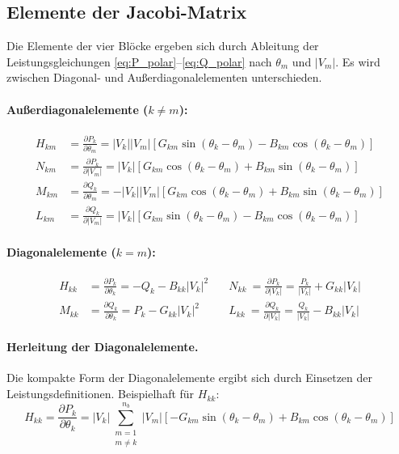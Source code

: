 \subsection{Elemente der Jacobi-Matrix}
\label{subsec:jacobi_elemente}

Die Elemente der vier Blöcke ergeben sich durch Ableitung der Leistungsgleichungen \eqref{eq:P_polar}--\eqref{eq:Q_polar} nach $\theta_m$ und $|V_m|$. Es wird zwischen Diagonal- und Außerdiagonalelementen unterschieden.

\paragraph{Außerdiagonalelemente ($k \neq m$):}
\begin{align}
	H_{km} &= \frac{\partial P_k}{\partial \theta_m} = |V_k||V_m|\left[G_{km}\sin(\theta_k - \theta_m) - B_{km}\cos(\theta_k - \theta_m)\right] \label{eq:H_off}\\[6pt]
	N_{km} &= \frac{\partial P_k}{\partial |V_m|} = |V_k|\left[G_{km}\cos(\theta_k - \theta_m) + B_{km}\sin(\theta_k - \theta_m)\right] \label{eq:N_off}\\[6pt]
	M_{km} &= \frac{\partial Q_k}{\partial \theta_m} = -|V_k||V_m|\left[G_{km}\cos(\theta_k - \theta_m) + B_{km}\sin(\theta_k - \theta_m)\right] \label{eq:M_off}\\[6pt]
	L_{km} &= \frac{\partial Q_k}{\partial |V_m|} = |V_k|\left[G_{km}\sin(\theta_k - \theta_m) - B_{km}\cos(\theta_k - \theta_m)\right] \label{eq:L_off}
\end{align}

\paragraph{Diagonalelemente ($k = m$):}
\begin{align}
	H_{kk} &= \frac{\partial P_k}{\partial \theta_k} = -Q_k - B_{kk}|V_k|^2 \quad &N_{kk}~= \frac{\partial P_k}{\partial |V_k|} = \frac{P_k}{|V_k|} + G_{kk}|V_k| \label{eq:N_diag}\\[6pt]
	M_{kk} &= \frac{\partial Q_k}{\partial \theta_k} = P_k - G_{kk}|V_k|^2  \quad &L_{kk}~= \frac{\partial Q_k}{\partial |V_k|} = \frac{Q_k}{|V_k|} - B_{kk}|V_k| \label{eq:L_diag}
\end{align}

\paragraph{Herleitung der Diagonalelemente.} Die kompakte Form der Diagonalelemente ergibt sich durch Einsetzen der Leistungsdefinitionen. Beispielhaft für $H_{kk}$:
\begin{equation}
	H_{kk} = \frac{\partial P_k}{\partial \theta_k} = |V_k| \sum_{\substack{m=1 \\ m \neq k}}^{n_b} |V_m|\left[-G_{km}\sin(\theta_k - \theta_m) + B_{km}\cos(\theta_k - \theta_m)\right]
	\label{eq:Hkk_herleitung_1}
\end{equation}

